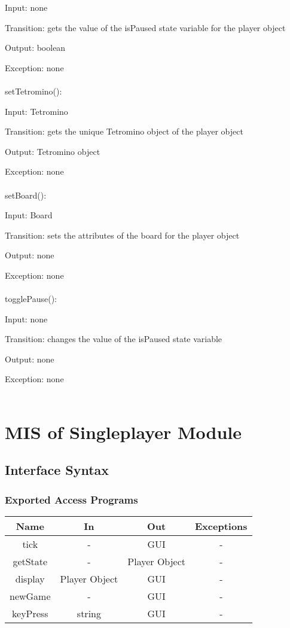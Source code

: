 \documentclass[12,english]{article}
\begin{document}
			Input: none
			
			Transition:  gets the value of the isPaused state variable for the player object
			
			Output: boolean
			
			Exception: none\\
			\\
			setTetromino():
			
			Input: Tetromino
			
			Transition:  gets the unique Tetromino object of the player object 
			
			Output: Tetromino object
			
			Exception: none\\
			\\
			setBoard():
			
			Input: Board
			
			Transition:  sets the attributes of the board for the player object 
			
			Output: none
			
			Exception: none\\
			\\
			togglePause():
			
			Input: none
			
			Transition:  changes the value of the isPaused state variable
			
			Output: none
			
			Exception: none\\
			\\			
			
			
			
			
			
			
			
			
			
			
			
\section{MIS of Singleplayer Module}
		\subsection{Interface Syntax}
			\subsubsection{Exported Access Programs}
				\begin{tabular}[pos]{|c|c|c|c|}
					
					\hline
					\textbf{Name}& \textbf{In} & \textbf{Out} & \textbf{Exceptions} \\ \hline
					tick &  - & GUI & -\\ \hline
					getState &  - & Player Object & -\\ \hline
					display &  Player Object & GUI & -\\ \hline
					newGame &  - & GUI & -\\ \hline
					keyPress & string & GUI & -\\ \hline
 				\end{tabular}
				\label{SingleplayerEAP}
\end{document}
